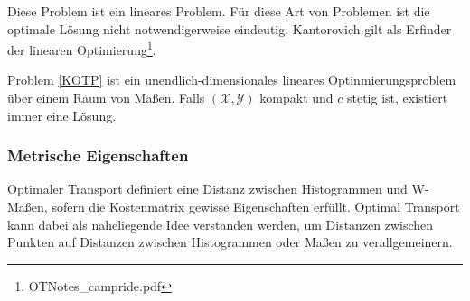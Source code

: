 \documentclass[11pt,a4paper]{article}
\newtheorem{definition}[theorem]{Definition}
\numberwithin{equation}{section}
\begin{document}
	Diese Problem ist ein lineares Problem. Für diese Art von Problemen ist die optimale Lösung nicht notwendigerweise eindeutig. Kantorovich gilt als Erfinder der linearen Optimierung\footnote{OTNotes\_campride.pdf}.

	Problem \autoref{KOTP} ist ein unendlich-dimensionales lineares Optinmierungsproblem über einem Raum von Maßen. Falls $(\mathcal{X}, \mathcal{Y})$ kompakt und $c$ stetig ist, existiert immer eine Lösung.
	
	
	\subsubsection{Metrische Eigenschaften}
	Optimaler Transport definiert eine Distanz zwischen Histogrammen und W-Maßen, sofern die Kostenmatrix gewisse Eigenschaften erfüllt. Optimal Transport kann dabei als naheliegende Idee verstanden werden, um Distanzen zwischen Punkten auf Distanzen zwischen Histogrammen oder Maßen zu verallgemeinern.
	
\end{document}
